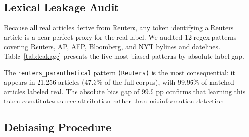 \documentclass[journal,10pt,twocolumn]{IEEEtran}
\begin{document}
\subsection{Lexical Leakage Audit}
\label{sec:leakage}

Because all real articles derive from Reuters, any token identifying a
Reuters article is a near-perfect proxy for the real label.  We audited
12 regex patterns covering Reuters, AP, AFP, Bloomberg, and NYT bylines
and datelines.  Table~\ref{tab:leakage} presents the five most biased
patterns by absolute label gap.

\begin{table}[h]
\centering
\caption{Top Leakage Patterns by Label Skew}
\label{tab:leakage}
\end{table}

The \texttt{reuters\_parenthetical} pattern \texttt{(Reuters)} is the
most consequential: it appears in 21{,}256 articles (47.3\% of the
full corpus), with 99.96\% of matched articles labeled real.  The
absolute bias gap of 99.9 pp confirms that learning this token
constitutes source attribution rather than misinformation detection.

\subsection{Debiasing Procedure}
\end{document}
